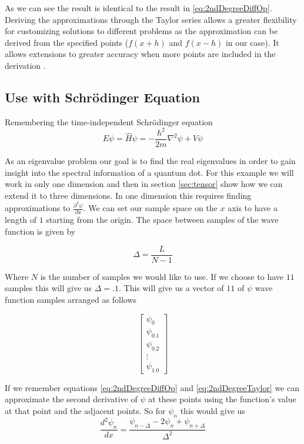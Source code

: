 \documentclass[authoryearcitations]{UoYCSproject}
\begin{document}
As we can see the result is identical to the result in \ref{eq:2ndDegreeDiffOp}. Deriving the approximations through
the Taylor series allows a greater flexibility for customizing solutions to different problems as the approximation
can be derived from the specified points ($f(x+h)$ and $f(x-h)$ in our case). It allows extensions to greater accuracy when
more points are included in the derivation \cite{cambridge}.  

\subsection{Use with Schr\"{o}dinger Equation}
\label{sec:useWithSchro}
Remembering the time-independent Schr\"{o}dinger equation
\begin{equation}
E\psi = \hat{H}\psi = -\frac{\hbar ^2}{2m}\nabla ^2\psi + V\psi \nonumber
\end{equation}

As an eigenvalue problem our goal is to find the real eigenvalues in order to gain insight into the spectral information
of a quantum dot. 
For this example we will work in only one dimension and then in section \ref{sec:tensor} show how we can extend
it to three dimensions. 
In one dimension this requires finding approximations to $\frac{\partial ^2 \psi}{\partial x}$. We can set our
sample space on the $x$ axis to have a length of $1$ starting from the origin. The space between samples of the 
wave function is given by

$$\Delta = \frac{L}{N - 1} $$

Where $N$ is the number of samples we would like to use. If we choose to have $11$ samples this will give us
$\Delta = .1$. This will give us a vector of $11$ of $\psi$ wave function samples arranged as follows 

$$\begin{bmatrix} 
        \psi _0  \\
        \psi _{0.1}  \\
        \psi _{0.2} \\
        \vdots    \\
        \psi _{1.0} 
   \end{bmatrix}
$$


If we remember equations \ref{eq:2ndDegreeDiffOp} and \ref{eq:2ndDegreeTaylor} we can approximate the second 
derivative of $\psi$ at these points
using the function's value at that point and the adjacent points. So for $\psi _{n}$ this would give us
$$\frac{d ^2 \psi _{n}}{dx} = \frac{\psi _{n-\Delta} - 2\psi _{n} + \psi _{n+\Delta}}{\Delta ^2} $$
\end{document}
